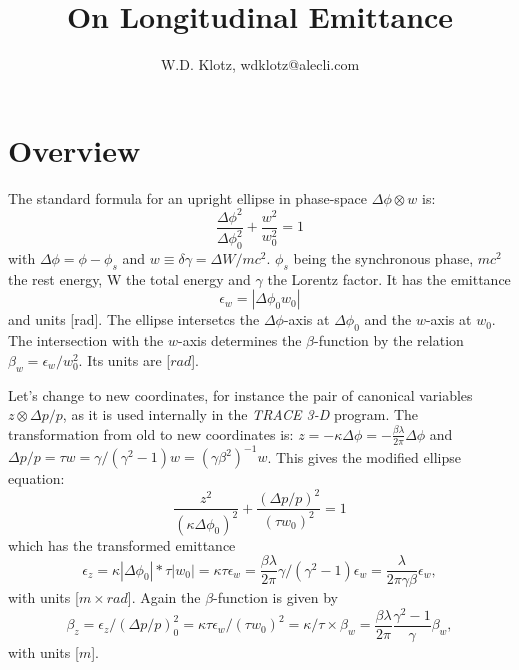 \documentclass{article}
\title{On Longitudinal Emittance}
\author{W.D. Klotz, wdklotz@alecli.com}
\begin{document}
\maketitle

\section{Overview}
The standard formula for an upright ellipse in phase-space $\Delta\phi\otimes w$ is:
\begin{equation}
\frac{\Delta\phi^{2}}{\Delta\phi_{0}^{2}}+\frac{w^{2}}{w_{0}^{2}}=1 \label{}
\end{equation}
with $ \Delta\phi = \phi - \phi_{s} $ and $ w \equiv \delta\gamma = \Delta W/mc^{2} $.
$ \phi_{s} $ being the synchronous phase, $ mc^{2} $ the rest energy, W the total energy and $ \gamma $ the Lorentz factor.
It has the emittance
\begin{equation}
\epsilon_{w} = |\Delta\phi_{0}w_{0}| \label{}
\end{equation}
and units [rad].
The ellipse intersetcs the $ \Delta\phi $-axis at $ \Delta\phi_{0} $ and the $ w $-axis at $ w_{0} $.
The intersection with the $w$-axis determines the $\beta$-function by the relation $\beta_{w} = \epsilon_{w}/w_{0}^{2}$. Its units are [$rad$].

Let's change to new coordinates, for instance the pair of canonical variables   $ z\otimes \Delta p/p $, as it is used internally in the \emph{ TRACE 3-D} program.
The transformation from old to new coordinates is:
$ z = -\kappa\Delta\phi =  -\frac{\beta \lambda} {2 \pi}  \Delta\phi $ and $ \Delta p/p = \tau w = \gamma/(\gamma^{2}-1) w = (\gamma \beta^{2})^{-1} w $.
This gives the modified ellipse equation:
\begin{equation}
\frac{z^{2}}{{(\kappa\Delta\phi_{0})}^{2}}+\frac{(\Delta p/p)^{2}}{{(\tau w_{0})^{2}}}=1 \label{}
\end{equation}
which has the transformed emittance 
\begin{equation}
\epsilon_{z} =  \kappa|\Delta\phi_{0}|*\tau |w_{0}| = \kappa\tau\epsilon_{w} = \frac{\beta \lambda} {2 \pi} \gamma/(\gamma^{2}-1) \epsilon_{w} = \frac{\lambda} {2 \pi \gamma \beta} \epsilon_{w}\label{},
\end{equation}
with units [$m\times rad$]. Again the $\beta$-function is given by 
\begin{equation}
\beta_{z}=\epsilon_{z}/(\Delta p/p)_{0}^{2}=\kappa\tau\epsilon_{w}/(\tau w_{0})^2=\kappa/\tau\times\beta_{w}=\frac{\beta \lambda}{2 \pi}\frac{\gamma^2-1}{\gamma}\beta_{w},
\end{equation}
with units [$m$].
\end{document}
